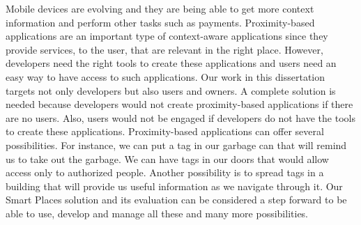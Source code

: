 Mobile devices are evolving and they are being able to get more context information and perform other tasks such as payments.
Proximity-based applications are an important type of context-aware applications since they provide services, to the user, that are relevant in the right place.
However, developers need the right tools to create these applications and users need an easy way to have access to such applications.
Our work in this dissertation targets not only developers but also users and owners.
A complete solution is needed because developers would not create proximity-based applications if there are no users.
Also, users would not be engaged if developers do not have the tools to create these applications.
Proximity-based applications can offer several possibilities.
For instance, we can put a tag in our garbage can that will remind us to take out the garbage.
We can have tags in our doors that would allow access only to authorized people.
Another possibility is to spread tags in a building that will provide us useful information as we navigate through it.
Our Smart Places solution and its evaluation can be considered a step forward to be able to use, develop and manage all these and many more possibilities.
